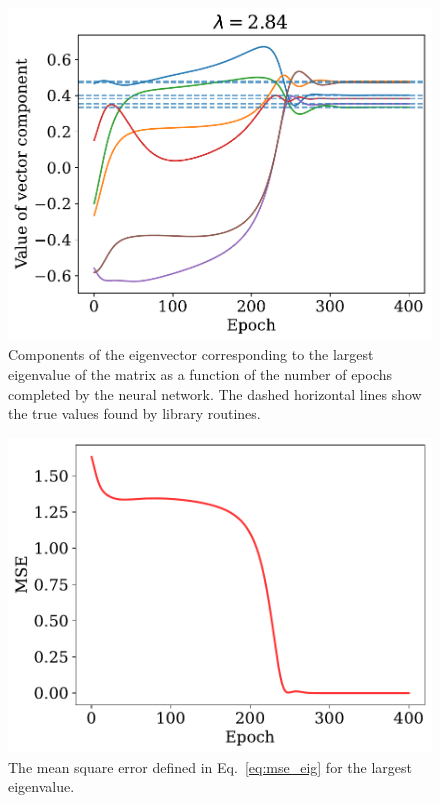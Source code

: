 \documentclass[a4paper, 
amsfonts, 
amssymb, 
amsmath, 
reprint, 
showkeys, 
nofootinbib, 
twoside]{revtex4-2}
\begin{document}
\begin{figure}
    \centering
    \includegraphics[width = \columnwidth]{Figures/NN_eigval.pdf}
    \caption{Components of the eigenvector corresponding to the largest eigenvalue of the matrix as a function of the number of epochs completed by the neural network. The dashed horizontal lines show the true values found by library routines. }
    \label{fig:nn_eigval}
\end{figure}


\begin{figure}
    \centering
    \includegraphics[width = \columnwidth]{Figures/NN_eigval_MSE.pdf}
    \caption{ The mean square error defined in Eq.~\eqref{eq:mse_eig} for the largest eigenvalue.  }
    \label{fig:nn_eigval_MSE}
\end{figure}
\end{document}
